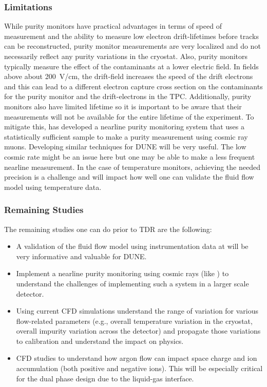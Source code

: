 \subsubsection{Limitations}
While purity monitors have practical advantages in terms of speed of measurement and the ability to measure low electron drift-lifetimes before tracks can be reconstructed, purity monitor measurements are very localized and do not necessarily reflect any purity variations in the cryostat. Also, purity monitors typically measure the effect of the contaminants at a lower electric field. In fields above about \SI{200}{\V/\cm}, the drift-field increases the speed of the drift electrons and this can lead to a different electron capture cross section on the contaminants for the purity monitor and the drift-electrons in the TPC. Additionally, purity monitors also have limited lifetime so it is important to be aware that their measurements will not be available for the entire lifetime of the experiment. To mitigate this,  has developed a nearline purity monitoring system that uses a statistically sufficient sample to make a purity measurement using cosmic ray muons. Developing similar techniques for DUNE will be very useful. The low cosmic rate might be an issue here but one may be able to make a less frequent nearline measurement. In the case of temperature monitors, achieving the needed precision is a challenge and will impact how well one can validate the fluid flow model using temperature data. 

\subsubsection{Remaining Studies}
The remaining studies one can do prior to TDR are the following:
\begin{itemize}
\item A validation of the fluid flow model using instrumentation data at  will be very informative and valuable for DUNE. 
\item Implement a nearline purity monitoring using cosmic rays (like ) to understand the challenges of implementing such a system in a larger scale detector.
\item Using current CFD simulations understand the range of variation for various flow-related parameters (e.g., overall temperature variation in the cryostat, overall impurity variation across the detector) and propagate those variations to calibration and understand the impact on physics.
\item CFD studies to understand how argon flow can impact space charge and ion accumulation (both positive and negative ions). This will be especially critical for the dual phase design due to the liquid-gas interface.
\end{itemize}

